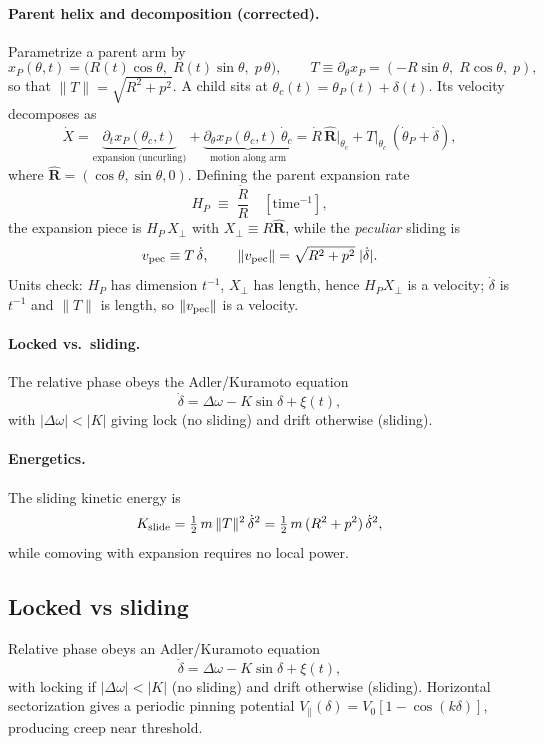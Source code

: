 \documentclass[11pt]{article}
\begin{document}
\paragraph{Parent helix and decomposition (corrected).}
Parametrize a parent arm by
\[
x_P(\theta,t)=\big(R(t)\cos\theta,\;R(t)\sin\theta,\;p\,\theta\big),\qquad 
T\equiv\partial_\theta x_P=(-R\sin\theta,\;R\cos\theta,\;p),
\tag{17}
\]
so that $\|T\|=\sqrt{R^2+p^2}$. A child sits at $\theta_c(t)=\theta_P(t)+\delta(t)$.
Its velocity decomposes as
\[
\dot X
=\underbrace{\partial_t x_P(\theta_c,t)}_{\text{expansion (uncurling)}} 
+\underbrace{\partial_\theta x_P(\theta_c,t)\,\dot\theta_c}_{\text{motion along arm}}
=\dot R\,\hat{\boldsymbol R}\big|_{\theta_c}
+T\big|_{\theta_c}\,(\dot\theta_P+\dot\delta),
\tag{18}
\]
where $\hat{\boldsymbol R}=(\cos\theta,\sin\theta,0)$. Defining the parent expansion rate
\[
H_P\;\equiv\;\frac{\dot R}{R}\quad [\text{time}^{-1}],
\]
the expansion piece is $H_P\,X_\perp$ with $X_\perp\equiv R\hat{\boldsymbol R}$, while the \emph{peculiar} sliding is
\[
v_{\rm pec}\equiv T\,\dot\delta,\qquad \|v_{\rm pec}\|=\sqrt{R^2+p^2}\;|\dot\delta|.
\]
Units check: $H_P$ has dimension $t^{-1}$, $X_\perp$ has length, hence $H_PX_\perp$ is a velocity; 
$\dot\delta$ is $t^{-1}$ and $\|T\|$ is length, so $\|v_{\rm pec}\|$ is a velocity.
\]
\paragraph{Locked vs.\ sliding.}
The relative phase obeys the Adler/Kuramoto equation
\[
\dot\delta=\Delta\omega-K\sin\delta+\xi(t),
\tag{19}
\]
with $|\Delta\omega|<|K|$ giving lock (no sliding) and drift otherwise (sliding).
\paragraph{Energetics.}
The sliding kinetic energy is
\[
K_{\rm slide}=\tfrac12\,m\,\|T\|^2\,\dot\delta^2=\tfrac12\,m\,(R^2+p^2)\,\dot\delta^2,
\]
while comoving with expansion requires no local power.

\subsection{Locked vs sliding}
Relative phase obeys an Adler/Kuramoto equation
\begin{equation}
\dot\delta=\Delta\omega-K\sin\delta+\xi(t),
\end{equation}
with locking if $|\Delta\omega|<|K|$ (no sliding) and drift otherwise (sliding). Horizontal sectorization gives a periodic pinning potential $V_\parallel(\delta)=V_0[1-\cos(k\delta)]$, producing creep near threshold.
\end{document}
